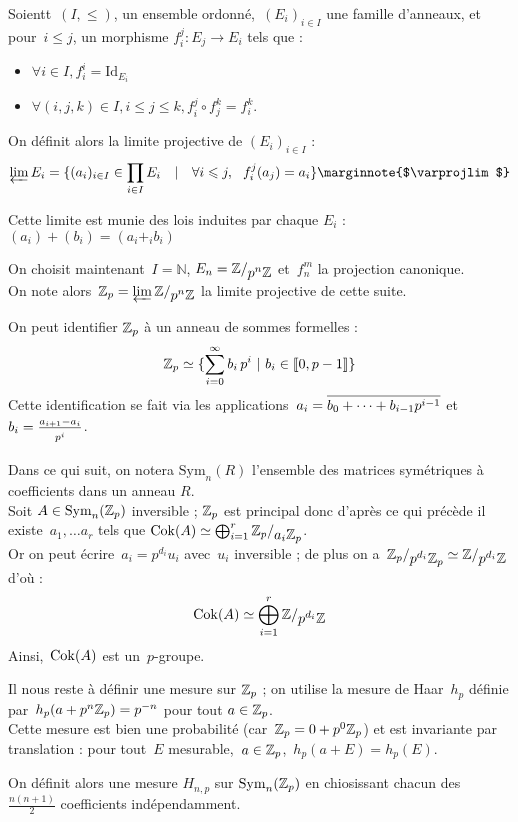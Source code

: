 \begin{defi}
Soientt~$(I, \leq)$, un ensemble ordonné,~$(E_i)_{i\in I}$ une famille d'anneaux, et pour~$i\leq j$, un morphisme $f_i^j : E_j \to E_i$ tels que :
\begin{itemize}
\item $\forall i\in I, f_i^i = \text{Id}_{E_i}$
\item $\forall (i,j,k)\in I, i\leq j\leq k, f_i^j \circ f_j^k = f_i^k$.
\end{itemize}
On définit alors la limite projective de $(E_i)_{i\in I}$ :
\[ \varprojlim{E_i} = \{(a_i)_{i\in I}\in \prod_{i\in I}{E_i}\quad |\quad\forall i\leq j,\ \  f_i^j(a_j) = a_i \} \text{\marginnote{$\varprojlim$}} \]

Cette limite est munie des lois induites par chaque $E_i$ : $(a_i) + (b_i) = (a_i +_i b_i)$
\end{defi}

On choisit maintenant~$I = \mathbb N$, $E_n = \quotient{\mathbb{Z}}{p^n \mathbb Z}$ et~$f_n^m$ la projection canonique.\\[0.2cm]
On note alors~$\Zp = \varprojlim{\quotient{\mathbb Z}{p^n\mathbb Z}}$ la limite projective de cette suite. \marginnote{$\Zp$}

\begin{rem}
On peut identifier $\Zp$ à un anneau de sommes formelles :
\[ \mathbb{Z}_p \simeq \{ \sum_{i=0}^\infty{b_i\,p^i}\   |\  b_i\in\llbracket0, p-1 \rrbracket\} \]
Cette identification se fait via les applications~$a_i = \overline{\strut b_0+\dots+b_{i-1}p^{i-1}}$ et~$b_i = \frac{a_{i+1}-a_i}{\strut p^i}$.\\
\end{rem}

Dans ce qui suit, on notera $\text{Sym}_n(R)$ l'ensemble des matrices symétriques à coefficients dans un anneau $R$.\\
Soit $A \in \operatorname{Sym}_n(\mathbb{Z}_p)$ inversible ; $\Zp$ est principal donc d'après ce qui précède il existe~$a_1, \dots a_r$ tels que $\Cok(A) \simeq \bigoplus_{i=1}^r{\quotient{\Zp}{a_i\Zp}}$.\\[0.2cm]
Or on peut écrire~$a_i = p^{d_i}u_i$ avec~$u_i$ inversible ; de plus on a~$\quotient{\Zp}{p^{d_i}\Zp} \simeq \quotient{\mathbb Z}{p^{d_i}\mathbb Z}$ d'où :
\[ \Cok(A) \simeq \bigoplus_{i=1}^r \quotient{\mathbb Z}{p^{d_i}\mathbb Z} \]
Ainsi,~$\operatorname{Cok}(A)$ est un~$p$-groupe.

Il nous reste à définir une mesure sur $\Zp$ ; on utilise la mesure de Haar~$h_p$ définie par~$h_p(a+p^n\mathbb{Z}_p) = p^{-n}$ pour tout $a\in\mathbb{Z}_p$.\\
Cette mesure est bien une probabilité (car~$\mathbb{Z}_p = 0+p^0\mathbb{Z}_p$) et est invariante par translation : pour tout~$E$ mesurable,~$a\in\mathbb{Z}_p$,~$h_p(a+E)=h_p(E)$.

On définit alors une mesure $H_{n,p}$ sur $\operatorname{Sym}_n(\mathbb{Z}_p)$ en chiosissant chacun des $\frac{n(n+1)}2$ coefficients indépendamment.